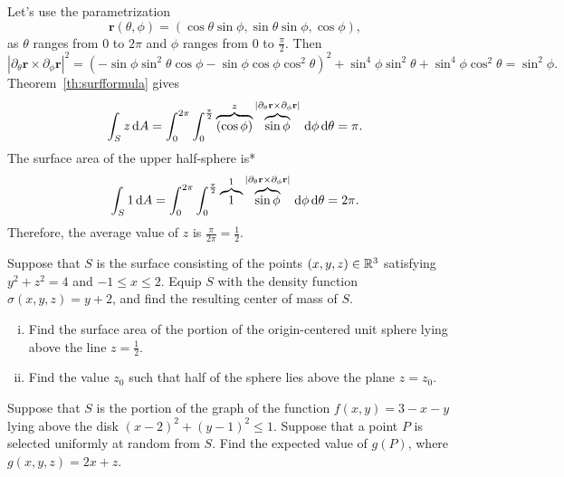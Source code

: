 \documentclass{watsonbook}
\begin{document}
\begin{solution}
  Let's use the parametrization 
  \[
    \mathbf{r}(\theta,\phi) =
    (\cos\theta\sin\phi,\sin\theta\sin\phi,\cos\phi), 
  \]
  as $\theta$ ranges from 0 to $2\pi$ and $\phi$ ranges from $0$ to
  $\frac{\pi}{2}$. Then 
  \[
    |\partial_\theta\mathbf{r} \times     \partial_\phi\mathbf{r} |^2=
    \left(- \sin{\phi} \sin^{2}{\theta
      } \cos{\phi} - \sin{\phi}
      \cos{\phi} \cos^{2}{\theta}\right)^{2} + \sin^{4}{\phi} \sin^{2}{\theta } + \sin^{4}{\phi}
    \cos^{2}{\theta } = \sin^2\phi. 
  \]
  Theorem~\ref{th:surfformula} gives 
  \[
    \int_S z \, \mathrm{d}{A} = \int_{0}^{2\pi} \int_{0}^{\frac{\pi}{2}}
    \overbrace{(\cos\phi)}^{z} \overbrace{\sin\phi}^{|\partial_\theta
      \mathbf{r}\times \partial_\phi \mathbf{r}|} \, \mathrm{d} \phi \, \mathrm{d}
    \theta = \pi. 
  \]
  The surface area of the upper half-sphere is* 
  \[
    \int_S 1 \, \mathrm{d}{A} = \int_{0}^{2\pi} \int_{0}^{\frac{\pi}{2}}
    \overbrace{1}^{1} \overbrace{\sin\phi}^{|\partial_\theta
      \mathbf{r}\times \partial_\phi \mathbf{r}|} \, \mathrm{d} \phi \, \mathrm{d}
    \theta = 2\pi. 
  \]
  Therefore, the average value of $z$ is
  $\displaystyle{\frac{\pi}{2\pi}} = \boxed{\frac{1}{2}}$. 
\end{solution}

\begin{exercise}{}{}
  Suppose that $S$ is the surface consisting of the points
  $(x,y,z) \in \mathbb{R}^3$ satisfying $y^2 + z^2 = 4$ and
  $-1 \leq x \leq 2$. Equip $S$ with the density function
  $\sigma(x,y,z) = y + 2$, and find the resulting center of mass of
  $S$.
\end{exercise}

\begin{exercise}{}{}
  \begin{enumerate}[(i),leftmargin=12pt]
  \item Find the surface area of the portion of the origin-centered
    unit sphere lying above the line $z = \frac{1}{2}$.
  \item Find the value $z_0$ such that half of the sphere lies above the
    plane $z = z_0$. 
  \end{enumerate}
\end{exercise}

\begin{exercise}{}{}
  Suppose that $S$ is the portion of the graph of the function
  $f(x,y) = 3 - x - y$ lying above the disk
  $(x-2)^2 + (y-1)^2 \leq 1$. Suppose that a point $P$ is selected
  uniformly at random from $S$. Find the expected value of $g(P)$,
  where $g(x,y,z) = 2x + z$. 
\end{exercise}
\end{document}
